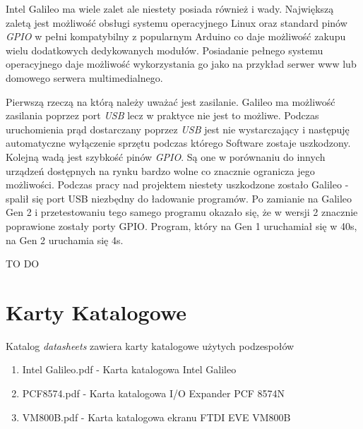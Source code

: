 \documentclass{xmgr}
\begin{document}
Intel Galileo ma wiele zalet ale niestety posiada również i wady. Największą zaletą jest możliwość obsługi systemu operacyjnego Linux oraz standard pinów \emph{GPIO} w pełni kompatybilny z popularnym Arduino co daje możliwość zakupu wielu dodatkowych dedykowanych modułów. Posiadanie pełnego systemu operacyjnego daje możliwość wykorzystania go jako na przykład serwer www lub domowego serwera multimedialnego. 

Pierwszą rzeczą na którą należy uważać jest zasilanie. Galileo ma możliwość zasilania poprzez port \emph{USB} lecz w praktyce nie jest to możliwe. Podczas uruchomienia prąd dostarczany poprzez \emph{USB} jest nie wystarczający i następuję automatyczne wyłączenie sprzętu podczas którego Software zostaje uszkodzony. Kolejną wadą jest szybkość pinów \emph{GPIO}. Są one w porównaniu do innych urządzeń dostępnych na rynku bardzo wolne co znacznie ogranicza jego możliwości. Podczas pracy nad projektem niestety uszkodzone zostało Galileo - spalił się port USB niezbędny do ładowanie programów. Po zamianie na Galileo Gen 2 i przetestowaniu tego samego programu okazało się, że w wersji 2 znacznie poprawione zostały porty GPIO. Program, który na Gen 1 uruchamiał się w 40s, na Gen 2 uruchamia się 4s.

\summary
TO DO

\appendix
\chapter{Karty Katalogowe}
Katalog \emph{datasheets} zawiera karty katalogowe użytych podzespołów
\begin{enumerate} 
\item Intel Galileo.pdf - Karta katalogowa Intel Galileo
\item PCF8574.pdf - Karta katalogowa I/O Expander PCF 8574N
\item VM800B.pdf - Karta katalogowa ekranu FTDI EVE VM800B
\end{enumerate}
\end{document}

